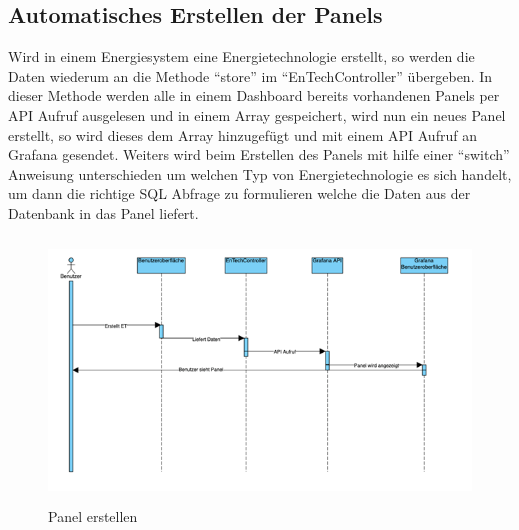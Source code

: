 \subsection{Automatisches Erstellen der Panels}\label{sec: Panels}
Wird in einem Energiesystem eine Energietechnologie erstellt, so werden die Daten wiederum an die Methode “store” im “EnTechController” übergeben. In dieser Methode werden alle in einem Dashboard bereits vorhandenen Panels per API Aufruf ausgelesen und in einem Array gespeichert, wird nun ein neues Panel erstellt, so wird dieses dem Array hinzugefügt und mit einem API Aufruf an Grafana gesendet. Weiters wird beim Erstellen des Panels mit hilfe einer “switch” Anweisung unterschieden um welchen Typ von Energietechnologie es sich handelt, um dann die richtige SQL Abfrage zu formulieren welche die Daten aus der Datenbank in das Panel liefert. 
\begin{figure}[h]
	\centering
	\includegraphics[height=7cm,width=14cm]{images/PanelErstellen}
	\caption{Panel erstellen}
	\label{fig:PanelErstellen }
\end{figure} 


